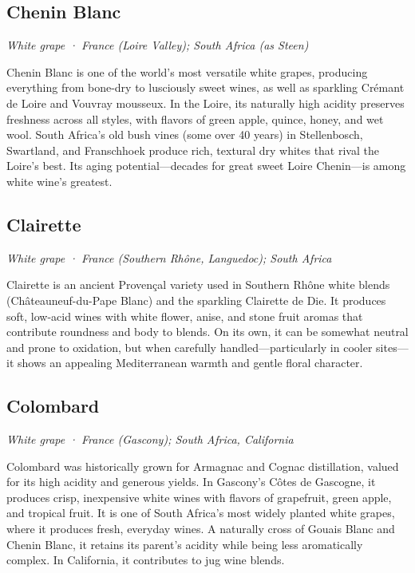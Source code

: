 \subsection*{Chenin Blanc}
\textit{White grape · France (Loire Valley); South Africa (as Steen)}\par\smallskip

Chenin Blanc is one of the world’s most versatile white grapes, producing everything from bone-dry to lusciously sweet wines, as well as sparkling Crémant de Loire and Vouvray mousseux. In the Loire, its naturally high acidity preserves freshness across all styles, with flavors of green apple, quince, honey, and wet wool. South Africa’s old bush vines (some over 40 years) in Stellenbosch, Swartland, and Franschhoek produce rich, textural dry whites that rival the Loire’s best. Its aging potential—decades for great sweet Loire Chenin—is among white wine’s greatest.

\subsection*{Clairette}
\textit{White grape · France (Southern Rhône, Languedoc); South Africa}\par\smallskip

Clairette is an ancient Provençal variety used in Southern Rhône white blends (Châteauneuf-du-Pape Blanc) and the sparkling Clairette de Die. It produces soft, low-acid wines with white flower, anise, and stone fruit aromas that contribute roundness and body to blends. On its own, it can be somewhat neutral and prone to oxidation, but when carefully handled—particularly in cooler sites—it shows an appealing Mediterranean warmth and gentle floral character.

\subsection*{Colombard}
\textit{White grape · France (Gascony); South Africa, California}\par\smallskip

Colombard was historically grown for Armagnac and Cognac distillation, valued for its high acidity and generous yields. In Gascony’s Côtes de Gascogne, it produces crisp, inexpensive white wines with flavors of grapefruit, green apple, and tropical fruit. It is one of South Africa’s most widely planted white grapes, where it produces fresh, everyday wines. A naturally cross of Gouais Blanc and Chenin Blanc, it retains its parent’s acidity while being less aromatically complex. In California, it contributes to jug wine blends.

